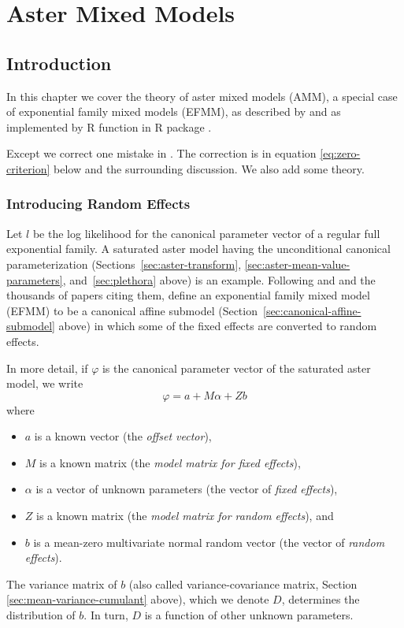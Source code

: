 
\chapter{Aster Mixed Models}
\label{ch:reaster}

\section{Introduction}

In this chapter we cover the theory of aster mixed models (AMM),
a special case of exponential family mixed models (EFMM),
as described by \citet*{reaster-tr,reaster} and as implemented by
R function  in R package  \citep{aster-package}.

Except we correct one mistake in \citet{reaster-tr,reaster}.
The correction is in equation \eqref{eq:zero-criterion}
below and the surrounding discussion.
We also add some theory.

\subsection{Introducing Random Effects}

Let $l$ be the log likelihood for the canonical parameter vector of a
regular full exponential family.
A saturated aster model having the unconditional
canonical parameterization (Sections~\ref{sec:aster-transform},
\ref{sec:aster-mean-value-parameters}, and~\ref{sec:plethora} above)
is an example.  Following \citet{breslow-clayton}
and \citet*{stiratelli-laird-ware} and the thousands of papers citing them,
\citet{reaster} define an exponential family mixed model (EFMM) to be
a canonical affine submodel (Section~\ref{sec:canonical-affine-submodel}
above) in which some of the fixed effects are converted to random effects.

In more detail, if $\varphi$ is the canonical parameter vector of the
saturated aster model, we write
\begin{equation} \label{eq:reaster-model-equation}
   \varphi = a + M \alpha + Z b
\end{equation}
where
\begin{itemize}
\item $a$ is a known vector (the \emph{offset vector}),
\item $M$ is a known matrix (the \emph{model matrix for fixed effects}),
\item $\alpha$ is a vector of unknown parameters (the vector of
    \emph{fixed effects}),
\item $Z$ is a known matrix (the \emph{model matrix for random effects}), and
\item $b$ is a mean-zero multivariate normal random vector (the vector of
    \emph{random effects}).
\end{itemize}
The variance matrix of $b$ (also called variance-covariance matrix,
Section \ref{sec:mean-variance-cumulant} above), which we denote $D$,
determines the distribution of $b$.  In turn, $D$ is a function of
other unknown parameters.

